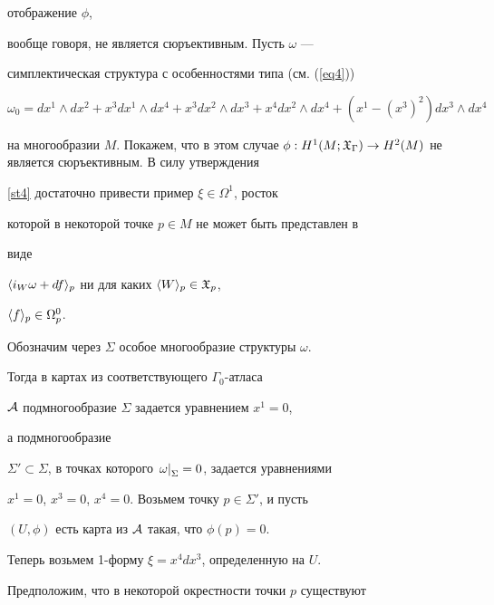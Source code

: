 отображение $\phi$,


вообще говоря, не является сюръективным. Пусть $\omega$ ---


симплектическая структура с особенностями типа (см. (\ref{eq4}))


$$




\omega_0 = dx^1 \wedge dx^2 + x^3 dx^1 \wedge dx^4 +


x^3 dx^2 \wedge dx^3 + x^4 dx^2 \wedge dx^4 + (x^1- (x^3)^2) dx^3


\wedge dx^4




$$


на многообразии $M$. Покажем, что в этом случае $\phi: H^1(M;


\gX_\Gamma)


\to H^2(M)$ не является сюръективным. В силу утверждения


\ref{st4} достаточно привести пример  $\xi \in \Omega^1$, росток


которой в некоторой точке $p \in M$ не может быть представлен в


виде


$\langle i_W\omega + df \rangle_{p}$ ни для каких $\langle W \rangle_{p} \in {\frak X}_p$,


$\langle f \rangle_{p} \in \Omega^0_p$.








Обозначим через $\Sigma$ особое многообразие структуры $\omega$.


Тогда в картах из соответствующего $\Gamma_0$-атласа


${\cal A}$ подмногообразие $\Sigma$ задается уравнением $x^1=0$,


а подмногообразие


$\Sigma' \subset


\Sigma$, в точках которого $\rest{\omega}{\Sigma}=0$, задается уравнениями


$x^1=0$, $x^3=0$, $x^4=0$. Возьмем точку $p \in \Sigma'$, и пусть


$(U,\phi)$ есть карта из ${\cal A}$ такая, что $\phi(p)=0$.





Теперь возьмем 1-форму $\xi = x^4 dx^3$, определенную на $U$.


Предположим, что в некоторой окрестности точки $p$ существуют


